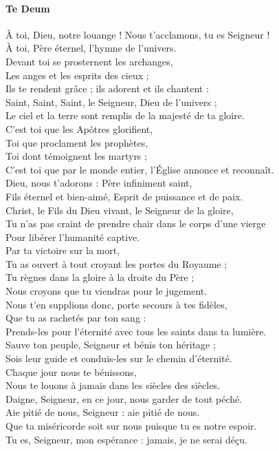 \documentclass[twoside]{article}
\begin{document}
\begin{paracol}[1]{2}

\switchcolumn

\paragraph{Te Deum}

À toi, Dieu, notre louange ! Nous t’acclamons, tu es Seigneur !\\
À toi, Père éternel, l’hymne de l’univers.\\
Devant toi se prosternent les archanges, \\
Les anges et les esprits des cieux ;\\
Ils te rendent grâce ; ils adorent et ils chantent :\\
Saint, Saint, Saint, le Seigneur, Dieu de l’univers ;\\
Le ciel et la terre sont remplis de la majesté de ta gloire.\\
C’est toi que les Apôtres glorifient,\\
Toi que proclament les prophètes,\\
Toi dont témoignent les martyrs ;\\
C’est toi que par le monde entier, l’Église annonce et reconnaît.\\
Dieu, nous t’adorons : Père infiniment saint,\\
Fils éternel et bien-aimé, Esprit de puissance et de paix.\\
Christ, le Fils du Dieu vivant, le Seigneur de la gloire,\\
Tu n’as pas craint de prendre chair dans le corps d’une vierge\\
Pour libérer l’humanité captive.\\
Par ta victoire sur la mort, \\
Tu as ouvert à tout croyant les portes du Royaume ;\\
Tu règnes dans la gloire à la droite du Père ;\\
Nous croyons que tu viendras pour le jugement.\\
Nous t'en supplions donc, porte secours à tes fidèles,\\
Que tu as rachetés par ton sang :\\
Prends-les pour l'éternité avec tous les saints dans ta lumière.\\
Sauve ton peuple, Seigneur et bénis ton héritage ;\\
Sois leur guide et conduis-les sur le chemin d’éternité.\\
Chaque jour nous te bénissons,\\
Nous te louons à jamais dans les siècles des siècles.\\
Daigne, Seigneur, en ce jour, nous garder de tout péché.\\
Aie pitié de nous, Seigneur : aie pitié de nous.\\
Que ta miséricorde soit sur nous puisque tu es notre espoir.\\
Tu es, Seigneur, mon espérance : jamais, je ne serai déçu.


\end{paracol}
\end{document}
